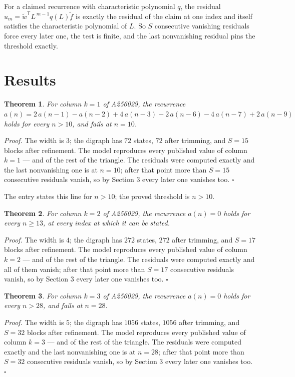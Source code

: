 \documentclass[11pt]{article}
\newtheorem{theorem}{Theorem}
\theoremstyle{definition}
\begin{document}
For a claimed recurrence with characteristic polynomial $q$, the residual $u_m = \tilde w^{\mathsf T}L^{\,m-1}q(L)\tilde f$ is exactly the residual of the claim at one index and itself satisfies the characteristic polynomial of $L$. So $S$ consecutive vanishing residuals force every later one, the test is finite, and the last nonvanishing residual pins the threshold exactly.

\section{Results}

\begin{theorem} For column $k = 1$ of A256029, the recurrence $a(n) = 2\,a(n-1) - a(n-2) + 4\,a(n-3) - 2\,a(n-6) - 4\,a(n-7) + 2\,a(n-9)$ holds for every $n > 10$, and fails at $n = 10$.\end{theorem}

{\itshape Proof.} The width is $3$; the digraph has $72$ states, $72$ after trimming, and $S = 15$ blocks after refinement. The model reproduces every published value of column $k = 1$ --- and of the rest of the triangle. The residuals were computed exactly and the last nonvanishing one is at $n = 10$; after that point more than $S = 15$ consecutive residuals vanish, so by Section 3 every later one vanishes too. $\square$

The entry states this line for $n > 10$; the proved threshold is $n > 10$.

\begin{theorem} For column $k = 2$ of A256029, the recurrence $a(n) = 0$ holds for every $n \ge 13$, at every index at which it can be stated.\end{theorem}

{\itshape Proof.} The width is $4$; the digraph has $272$ states, $272$ after trimming, and $S = 17$ blocks after refinement. The model reproduces every published value of column $k = 2$ --- and of the rest of the triangle. The residuals were computed exactly and all of them vanish; after that point more than $S = 17$ consecutive residuals vanish, so by Section 3 every later one vanishes too. $\square$

\begin{theorem} For column $k = 3$ of A256029, the recurrence $a(n) = 0$ holds for every $n > 28$, and fails at $n = 28$.\end{theorem}

{\itshape Proof.} The width is $5$; the digraph has $1056$ states, $1056$ after trimming, and $S = 32$ blocks after refinement. The model reproduces every published value of column $k = 3$ --- and of the rest of the triangle. The residuals were computed exactly and the last nonvanishing one is at $n = 28$; after that point more than $S = 32$ consecutive residuals vanish, so by Section 3 every later one vanishes too. $\square$
\end{document}

